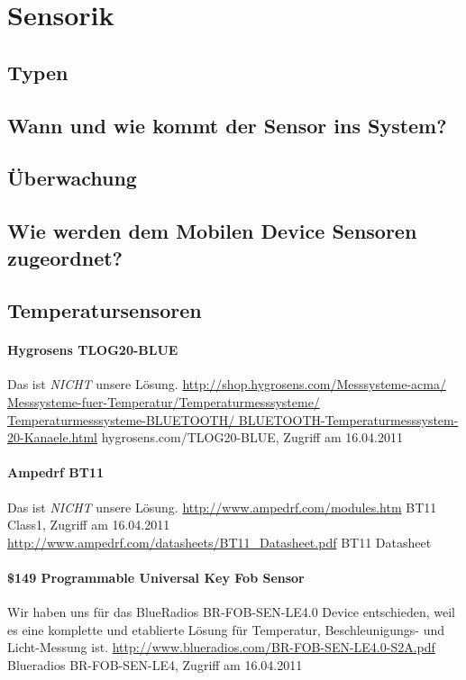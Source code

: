 \section{Sensorik}

\subsection{Typen}


\subsection{Wann und wie kommt der Sensor ins System?}

\subsection{Überwachung}

\subsection{Wie werden dem Mobilen Device Sensoren zugeordnet?}

\subsection{Temperatursensoren}
	\paragraph{Hygrosens TLOG20-BLUE}
		Das ist \textit{NICHT} unsere Lösung.
		\url{http://shop.hygrosens.com/Messsysteme-acma/
			Messsysteme-fuer-Temperatur/Temperaturmesssysteme/
			Temperaturmesssysteme-BLUETOOTH/
			BLUETOOTH-Temperaturmesssystem-20-Kanaele.html}
			{hygrosens.com/TLOG20-BLUE, Zugriff am 16.04.2011}
	\par
	
	\paragraph{Ampedrf BT11}
		Das ist \textit{NICHT} unsere Lösung.
		\url{http://www.ampedrf.com/modules.htm}
		{BT11 Class1, Zugriff am 16.04.2011}
		\url{http://www.ampedrf.com/datasheets/BT11_Datasheet.pdf}
		{BT11 Datasheet}
	\par 

	\paragraph{\$149 Programmable Universal Key Fob Sensor}
		Wir haben uns für das BlueRadios BR-FOB-SEN-LE4.0 Device  entschieden, weil es
		eine komplette und etablierte Lösung für Temperatur, Beschleunigungs- und
		Licht-Messung ist.
		\url{http://www.blueradios.com/BR-FOB-SEN-LE4.0-S2A.pdf}
		{Blueradios BR-FOB-SEN-LE4, Zugriff am 16.04.2011}
		
